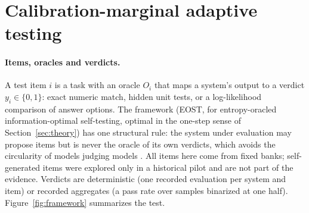 \section{Calibration-marginal adaptive testing}
\label{sec:framework}

\paragraph{Items, oracles and verdicts.} A test item $i$ is a task with an oracle $O_i$ that
maps a system's output to a verdict $y_i\in\{0,1\}$: exact numeric match, hidden unit tests,
or a log-likelihood comparison of answer options. The framework (EOST, for entropy-oracled
information-optimal self-testing, optimal in the one-step sense of Section~\ref{sec:theory})
has one structural rule: the system under evaluation may propose items but is never the
oracle of its own verdicts, which avoids the circularity of models judging models
\citep{zheng2023judging}. All items here come from fixed banks; self-generated items were
explored only in a historical pilot and are not part of the evidence. Verdicts are
deterministic (one recorded evaluation per system and item) or recorded aggregates (a pass
rate over samples binarized at one half). Figure~\ref{fig:framework} summarizes the test.

